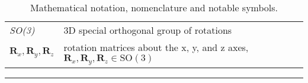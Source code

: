 \begin{table*}[!h]
\begin{tabular}{lll}
    \emph{SO(3)} & 3D special orthogonal group of rotations\\
    $\mathbf{R}_x, \mathbf{R}_y, \mathbf{R}_z$ & rotation matrices about the x, y, and z axes, $\mathbf{R}_x, \mathbf{R}_y, \mathbf{R}_z \in \mathrm{SO}(3)$ \\
  \end{tabular}
  \noindent\rule{\textwidth}{0.5pt}
  \caption{Mathematical notation, nomenclature and notable symbols.}
  \label{tab:mathematical_notation}
\end{table*}
